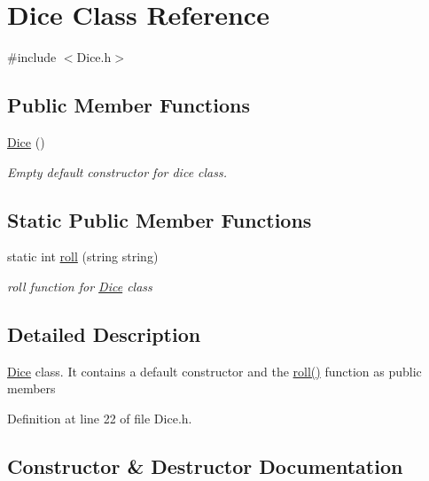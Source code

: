\hypertarget{class_dice}{}\section{Dice Class Reference}
\label{class_dice}


{\ttfamily \#include $<$Dice.\+h$>$}

\subsection*{Public Member Functions}
\begin{DoxyCompactItemize}
\item 
\hyperlink{class_dice_a6b9eadd945ad8fd3840379c8824e5d48}{Dice} ()
\begin{DoxyCompactList}\small\item\em Empty default constructor for dice class. \end{DoxyCompactList}\end{DoxyCompactItemize}
\subsection*{Static Public Member Functions}
\begin{DoxyCompactItemize}
\item 
static int \hyperlink{class_dice_a7428dd940e0af226820414ca07147771}{roll} (string string)
\begin{DoxyCompactList}\small\item\em roll function for \hyperlink{class_dice}{Dice} class \end{DoxyCompactList}\end{DoxyCompactItemize}


\subsection{Detailed Description}
\hyperlink{class_dice}{Dice} class. It contains a default constructor and the \hyperlink{class_dice_a7428dd940e0af226820414ca07147771}{roll()} function as public members 

Definition at line 22 of file Dice.\+h.



\subsection{Constructor \& Destructor Documentation}
\hypertarget{class_dice_a6b9eadd945ad8fd3840379c8824e5d48}{}
